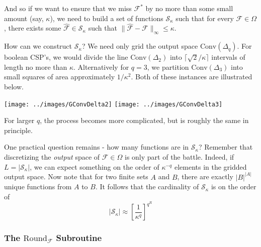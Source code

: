 \documentclass[letterpaper, 12pt]{article}
\numberwithin{equation}{section}
\begin{document}
And so if we want to ensure that we miss $\mathcal{F}^*$ by no more than some small amount (say, $\kappa$), we need to build a set of functions $\mathcal{S}_\kappa$ such that for every $\mathcal{F} \in \Omega$, there exists some $\hat{\mathcal{F}} \in \mathcal{S}_\kappa$ such that $\| \hat{\mathcal{F}} - \mathcal{F} \|_{\infty} \leq \kappa $.

How can we construct $\mathcal{S}_\kappa$? We need only grid the output space $\text{Conv}(\Delta_q)$. For boolean CSP's, we would divide the line $\text{Conv}(\Delta_2)$ into $\lceil \sqrt{2}/\kappa \rceil$ intervals of length no more than $\kappa$. Alternatively for $ q = 3$, we partition $\text{Conv}(\Delta_3)$ into small squares of area approximately $1/\kappa^2$. Both of these instances are illustrated below.

\begin{center}
\texttt{[image: ../images/GConvDelta2]} \qquad
\texttt{[image: ../images/GConvDelta3]}
\end{center}

For larger $q$, the process becomes more complicated, but is roughly the same in principle.

One practical question remains - how many functions are in $\mathcal{S}_\kappa$? Remember that discretizing the \textit{output} space of $\mathcal{F} \in \Omega$ is only part of the battle. Indeed, if $L = |\mathcal{S}_\kappa|$, we can expect something on the order of $\kappa^{-q}$ elements in the gridded output space. Now note that for two finite sets $A$ and $B$, there are exactly $|B|^{|A|}$ unique functions from $A$ to $B$. It follows that the cardinality of $\mathcal{S}_\kappa$ is on the order of
\begin{equation}
|\mathcal{S}_\kappa| \approx \left[\frac{1}{\kappa^q}\right]^{q^R}
\end{equation}

\subsubsection{The $\text{Round}_{\mathcal{F}}$ Subroutine}
\end{document}
